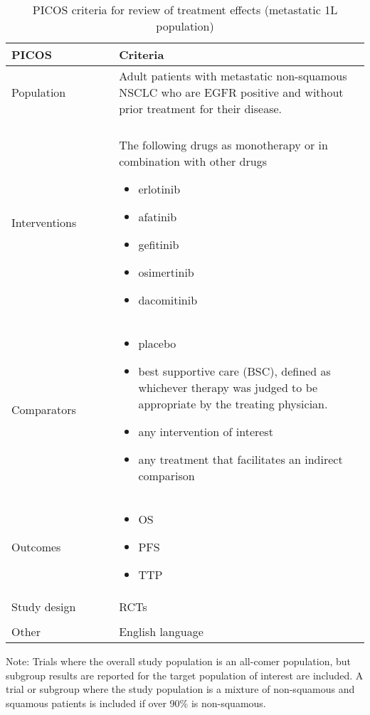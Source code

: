\documentclass[11pt,final,fleqn]{article}\usepackage[]{graphicx}\usepackage[]{color}
\theoremstyle{plain}
\begin{document}
\begin{appendices}
\begin{table}[!ht]
\begin{center}
\begin{threeparttable}
\caption{PICOS criteria for review of treatment effects (metastatic 1L population)} \label{tbl:picos-tx-effects-1L}
\begin{tabular}{p{0.3\linewidth}p{0.7\linewidth}}
\hline
\multicolumn{1}{l}{PICOS} &  \multicolumn{1}{l}{Criteria}\\
\hline
Population & Adult patients with metastatic non-squamous NSCLC who are EGFR positive and without prior treatment for their disease.\\
&\\
Interventions & The following drugs as monotherapy or in combination with other drugs 
\begin{itemize}
\item erlotinib
\item afatinib
\item gefitinib
\item osimertinib
\item dacomitinib
\end{itemize} \\
Comparators & 
\begin{itemize}
\item placebo
\item best supportive care (BSC), defined as whichever therapy was judged to be appropriate by the treating physician.
\item any intervention of interest
\item any treatment that facilitates an indirect comparison
\end{itemize} \\
Outcomes & 
\begin{itemize}
\item OS
\item PFS
\item TTP
\end{itemize} \\
Study design & RCTs \\
&\\
Other & English language\\
\hline
\end{tabular}
\scriptsize Note: Trials where the overall study population is an all-comer population, but subgroup results are reported for the target population of interest are included. A trial or subgroup where the study population is a mixture of non-squamous and squamous patients is included if over 90\% is non-squamous. 
\end{threeparttable}
\end{center}
\end{table}



\end{appendices}
\end{document}
